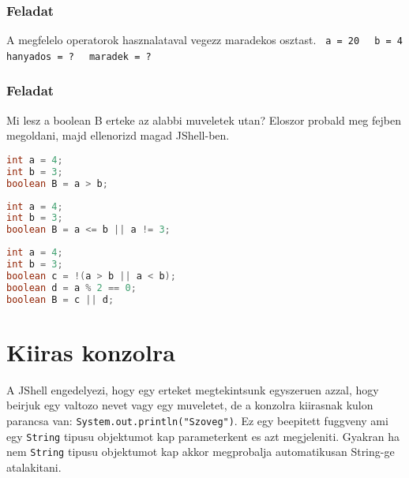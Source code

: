 \documentclass{article}
\begin{document}
\subsubsection{Feladat}

A megfelelo operatorok hasznalataval vegezz maradekos osztast.\newline
\lstinline[mathescape]{ a = 20 }\newline
\lstinline[mathescape]{ b = 4 }\newline
\lstinline[mathescape]{ hanyados = ? }\newline
\lstinline[mathescape]{ maradek = ? }\newline

\subsubsection{Feladat}

Mi lesz a boolean B erteke az alabbi muveletek utan? Eloszor probald meg fejben megoldani, majd ellenorizd magad JShell-ben.

\begin{lstlisting}[language=Java, caption=Muvelet 1.]
int a = 4;
int b = 3;
boolean B = a > b;
\end{lstlisting}

\begin{lstlisting}[language=Java, caption=Muvelet 1.]
int a = 4;
int b = 3;
boolean B = a <= b || a != 3;
\end{lstlisting}

\begin{lstlisting}[language=Java, caption=Muvelet 1.]
int a = 4;
int b = 3;
boolean c = !(a > b || a < b);
boolean d = a % 2 == 0;
boolean B = c || d;
\end{lstlisting}

\newpage

\section{Kiiras konzolra}

A JShell engedelyezi, hogy egy erteket megtekintsunk egyszeruen azzal, hogy beirjuk egy valtozo nevet vagy egy muveletet, de a konzolra kiirasnak kulon parancsa van: \lstinline{System.out.println("Szoveg")}.
Ez egy beepitett fuggveny ami egy \lstinline{String} tipusu objektumot kap parameterkent es azt megjeleniti. Gyakran ha nem \lstinline{String} tipusu objektumot kap akkor megprobalja automatikusan String-ge atalakitani.
\end{document}
